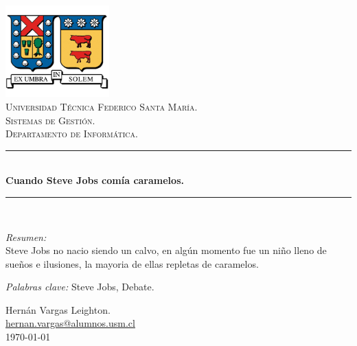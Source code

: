 \documentclass{article}
\newcommand{\HRule}{\rule{\linewidth}{0.5mm}}
\begin{document}
\begin{titlepage}
	\begin{center}
		\includegraphics[width=0.30\textwidth]{Logo_UTFSM.png}~\\[1cm]
		\textsc{\LARGE Universidad Técnica Federico Santa María.}\\[1.2cm]
		\textsc{\Large Sistemas de Gestión.}\\[0.2cm]
		\textsc{\Large Departamento de Informática.}\\[0.2cm]
	
		\HRule \\[0.4cm]
		{ \huge \bfseries Cuando Steve Jobs comía caramelos.\\[0.4cm] }
		\HRule \\[1.5cm]
		
		\begin{minipage}{0.9\textwidth}
			\begin{flushleft} \large
				\emph{Resumen:} \\
				Steve Jobs no nacio siendo un calvo, en algún momento fue un niño
				lleno de sueños e ilusiones, la mayoria de ellas repletas de caramelos.
			\end{flushleft}
			\begin{flushright} 
				\emph{Palabras clave:} Steve Jobs, Debate.
			\end{flushright}
		\end{minipage}
		\vfill
	
		{\large Hernán Vargas Leighton.\\
		\href{mailto:hernan.vargas@alumnos.usm.cl}{hernan.vargas@alumnos.usm.cl}
		\\[0.2cm] \today }
	\end{center}
\end{titlepage}
\end{document}
